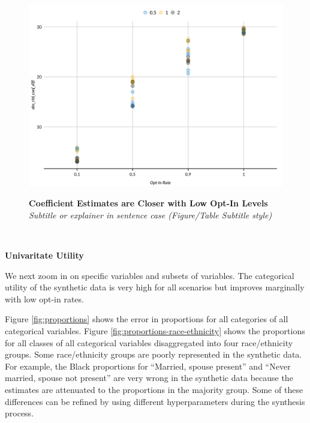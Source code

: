 \documentclass[
]{urban-formatting}
\begin{document}
\begin{figure}[htbp]
    \caption{
    \textbf{Coefficient Estimates are Closer with Low Opt-In Levels}\\
    \textit{Subtitle or explainer in sentence case (Figure/Table Subtitle style)}
    }
    \centering
    \includegraphics[width=6.5in]{../analysis/figures/regression-overlap-1.png}
    \label{fig:regression}
\end{figure}
\begin{singlespace}
    \\
\end{singlespace}

\textbf{Univaritate Utility}

We next zoom in on specific variables and subsets of variables. The
categorical utility of the synthetic data is very high for all scenarios
but improves marginally with low opt-in rates.

Figure \ref{fig:proportions} shows the error in proportions for all
categories of all categorical variables. Figure
\ref{fig:proportions-race-ethnicity} shows the proportions for all
classes of all categorical variables disaggregated into four
race/ethnicity groups. Some race/ethnicity groups are poorly represented
in the synthetic data. For example, the Black proportions for ``Married,
spouse present'' and ``Never married, spouse not present'' are very
wrong in the synthetic data because the estimates are attenuated to the
proportions in the majority group. Some of these differences can be
refined by using different hyperparameters during the synthesis process.
\end{document}
